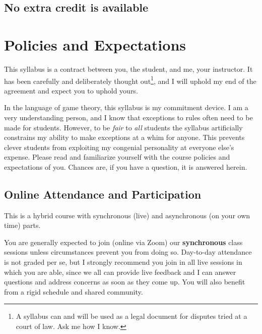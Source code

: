 \documentclass{article}
\begin{document}
\hypertarget{no-extra-credit-is-available}{%
\subsection*{No extra credit is
available}\label{no-extra-credit-is-available}}

\hypertarget{policies-and-expectations}{%
\section*{Policies and Expectations}\label{policies-and-expectations}}

This syllabus is a contract between you, the student, and me, your
instructor. It has been carefully and deliberately thought
out\footnote{A syllabus can and will be used as a legal document for
  disputes tried at a court of law. Ask me how I know.}, and I will
uphold my end of the agreement and expect you to uphold yours.

In the language of game theory, this syllabus is my commitment device. I
am a very understanding person, and I know that exceptions to rules
often need to be made for students. However, to be \emph{fair} to
\emph{all} students the syllabus artificially constrains my ability to
make exceptions at a whim for anyone. This prevents clever students from
exploiting my congenial personality at everyone else's expense. Please
read and familiarize yourself with the course policies and expectations
of you. Chances are, if you have a question, it is answered herein.

\hypertarget{online-attendance-and-participation}{%
\subsection*{Online Attendance and
Participation}\label{online-attendance-and-participation}}

This is a hybrid course with synchronous (live) and asynchronous (on
your own time) parts.

You are generally expected to join (online via Zoom) our
\textbf{synchronous} class sessions unless circumstances prevent you
from doing so. Day-to-day attendance is not graded per se, but I
strongly recommend you join in all live sessions in which you are able,
since we all can provide live feedback and I can answer questions and
address concerns as soon as they come up. You will also benefit from a
rigid schedule and shared community.
\end{document}
